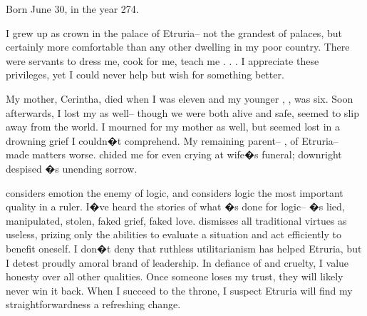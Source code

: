 \documentclass[char]{Kos}
\begin{document}
\name{\cGroom{}}

Born June 30, in the year 274.

I grew up as crown \cGroom{\prince} in the palace of Etruria-- not the grandest of palaces, but certainly more comfortable than any other dwelling in my poor country. There were servants to dress me, cook for me, teach me . . . I appreciate these privileges, yet I could never help but wish for something better.

My mother, Cerintha, died when I was eleven and my younger \cPoet{\sibling}, \cPoet{\nickname}, was six. Soon afterwards, I lost my \cPoet{\sibling} as well-- though we were both alive and safe, \cPoet{\they} seemed to slip away from the world. I mourned for my mother as well, but \cPoet{\they} seemed lost in a drowning grief I couldn�t comprehend. My remaining parent-- \cEtruriaKing{}, \cEtruriaKing{\Monarch} of Etruria-- made matters worse. \cEtruriaKing{\They} chided me for even crying at \cEtruriaKing{\their} wife�s funeral; \cEtruriaKing{\their} downright despised \cPoet{\nickname}�s unending sorrow. 

\cEtruriaKing{\Parent} considers emotion the enemy of logic, and \cEtruriaKing{\they} considers logic the most important quality in a ruler. I�ve heard the stories of what \cEtruriaKing{\they}�s done for logic-- \cEtruriaKing{\they}�s lied, manipulated, stolen, faked grief, faked love. \cEtruriaKing{\They} dismisses all traditional virtues as useless, prizing only the abilities to evaluate a situation and act efficiently to benefit oneself. I don�t deny that \cEtruriaKing{\their} ruthless utilitarianism has helped Etruria, but I detest \cEtruriaKing{\their} proudly amoral brand of leadership. In defiance of \cEtruriaKing{\them} and \cEtruriaKing{\their} cruelty, I value honesty over all other qualities. Once someone loses my trust, they will likely never win it back. When I succeed to the throne, I suspect Etruria will find my straightforwardness a refreshing change.
\end{document}
